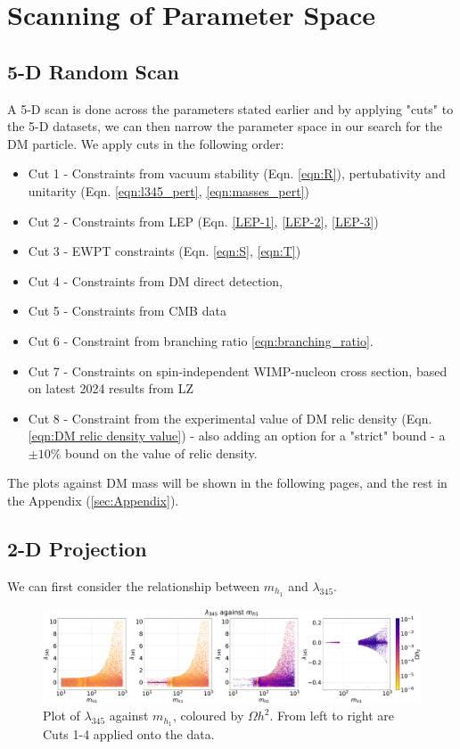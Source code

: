 \documentclass[12pt]{article}
\begin{document}
\section{Scanning of Parameter Space}
\label{sec:results}
\subsection{5-D Random Scan}
\label{5-D scan}
A 5-D scan is done across the parameters stated earlier and by applying "cuts" to the 5-D datasets, we can then narrow the parameter space in our search for the DM particle.
We apply cuts in the following order:
\begin{itemize}
    \item Cut 1 - Constraints from vacuum stability (Eqn. \ref{eqn:R}), pertubativity and unitarity (Eqn. \ref{eqn:l345_pert}, \ref{eqn:masses_pert}) 
    \item Cut 2 - Constraints from LEP (Eqn. \ref{LEP-1}, \ref{LEP-2}, \ref{LEP-3}) 
    \item  Cut 3 - EWPT constraints (Eqn. \ref{eqn:S}, \ref{eqn:T}) 
    \item Cut 4 - Constraints from DM direct detection, 
    \item Cut 5 - Constraints from CMB data
    \item  Cut 6 - Constraint from branching ratio \ref{eqn:branching_ratio}.
    \item Cut 7 - Constraints on spin-independent WIMP-nucleon cross section, based on latest 2024 results from LZ \cite{aalbers2024darkmattersearchresults}
    \item Cut 8 - Constraint from the experimental value of DM relic density (Eqn. \ref{eqn:DM relic density value}) - also adding an option for a "strict" bound - a $\pm 10 \%$ bound on the value of relic density.
\end{itemize}

The plots against DM mass will be shown in the following pages, and the rest in the Appendix (\ref{sec:Appendix}).

\subsection{2-D Projection}
\label{sec:2D-proj}
We can first consider the relationship between $m_{h_1}$ and $\lambda_{345}$. 
\begin{figure}[ht]
    \centering
    \includegraphics[width=\linewidth]{4plot/l345_MD1.pdf}
    \caption{Plot of $\lambda_{345}$ against $m_{h_1}$, coloured by $\Omega h^2$. From left to right are Cuts 1-4 applied onto the data.}
    \label{fig:l345_md1_main}
\end{figure}
\end{document}
